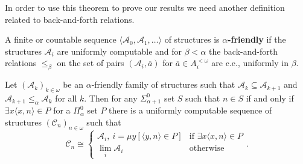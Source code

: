 \documentclass[10pt,a4paper]{amsart}
\newcommand\+[1]{\mathcal{#1}}
\renewcommand\*[1]{\mathbf{#1}}
\renewcommand\=[1]{\text{#1}}
\renewcommand\*[1]{\mathbf{#1}}
\newcommand{\A}{\mathcal{A}}
\newcommand{\ol}[1]{\overline{#1}}
\newcommand{\mc}[1]{\mathcal{#1}}
\newcommand{\define}[1]{\textbf{#1}}
\begin{document}
In order to use this theorem to prove our results we need another definition related to back-and-forth relations.
\begin{definition}\label{def:alphafriendly}
A finite or countable sequence $\langle \A_0,\A_1,\dots \rangle$ of structures is \define{$\alpha$-friendly} if the structures $\A_i$ are uniformly computable and for $\beta<\alpha$ the back-and-forth relations $\leq_\beta$ on the set of pairs $(\A_i, \ol a)$ for $\ol a\in A_i^{<\omega}$ are c.e., uniformly in $\beta$.
\end{definition}


\begin{lemma}\label{thm:alphalimit}
Let $( \mc A_k )_{k\in \omega}$ be an $\alpha$-friendly family of structures such that $\mc A_k\subseteq \mc A_{k+1}$ and $\mc A_{k+1}\leq_{\alpha} \mc A_k$ for all $k$. Then for any $\Sigma_{\alpha+1}^0$ set $S$ such that $n\in S$ if and only if $\exists x \langle x,n\rangle \in P$ for a $\Pi_{\alpha}^0$ set $P$ there is a uniformly computable sequence of structures $(\mc C_n)_{n\in \omega}$ such that
\[ \mc C_n \cong \begin{cases} \mc A_i,\ i =\mu y[\langle y,n\rangle \in P] & \text{if } \exists x \langle x,n\rangle \in P\\
\lim_i \mc A_i & \text{otherwise}
\end{cases}.\]
\end{lemma}
\end{document}
